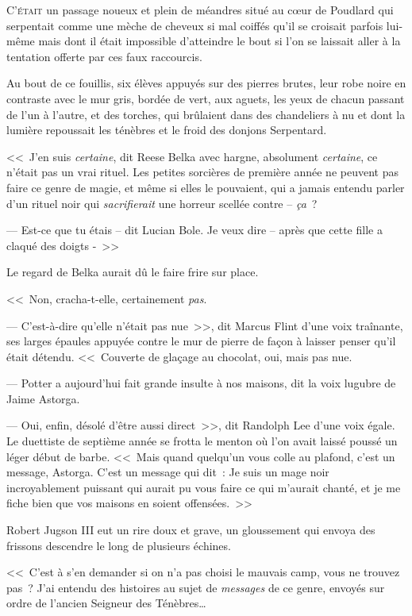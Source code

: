 
\lettrine{C}{'était} un passage noueux et plein de méandres situé au cœur de Poudlard qui serpentait comme une mèche de cheveux si mal coiffés qu'il se croisait parfois lui-même mais dont il était impossible d'atteindre le bout si l'on se laissait aller à la tentation offerte par ces faux raccourcis.

Au bout de ce fouillis, six élèves appuyés sur des pierres brutes, leur robe noire en contraste avec le mur gris, bordée de vert, aux aguets, les yeux de chacun passant de l'un à l'autre, et des torches, qui brûlaient dans des chandeliers à nu et dont la lumière repoussait les ténèbres et le froid des donjons Serpentard.

<<~J'en suis \emph{certaine}, dit Reese Belka avec hargne, absolument \emph{certaine}, ce n'était pas un vrai rituel. Les petites sorcières de première année ne peuvent pas faire ce genre de magie, et même si elles le pouvaient, qui a jamais entendu parler d'un rituel noir qui \emph{sacrifierait} une horreur scellée contre -- \emph{ça}~?

--- Est-ce que tu étais -- dit Lucian Bole. Je veux dire -- après que cette fille a claqué des doigts -~>>

Le regard de Belka aurait dû le faire frire sur place.

<<~Non, cracha-t-elle, certainement \emph{pas}.

--- C'est-à-dire qu'elle n'était pas nue~>>, dit Marcus Flint d'une voix traînante, ses larges épaules appuyée contre le mur de pierre de façon à laisser penser qu'il était détendu. <<~Couverte de glaçage au chocolat, oui, mais pas nue.

--- Potter a aujourd'hui fait grande insulte à nos maisons, dit la voix lugubre de Jaime Astorga.

--- Oui, enfin, désolé d'être aussi direct~>>, dit Randolph Lee d'une voix égale. Le duettiste de septième année se frotta le menton où l'on avait laissé poussé un léger début de barbe. <<~Mais quand quelqu'un vous colle au plafond, c'est un message, Astorga. C'est un message qui dit~: Je suis un mage noir incroyablement puissant qui aurait pu vous faire ce qui m'aurait chanté, et je me fiche bien que vos maisons en soient offensées.~>>

Robert Jugson III eut un rire doux et grave, un gloussement qui envoya des frissons descendre le long de plusieurs échines.

<<~C'est à s'en demander si on n'a pas choisi le mauvais camp, vous ne trouvez pas~? J'ai entendu des histoires au sujet de \emph{messages} de ce genre, envoyés sur ordre de l'ancien Seigneur des Ténèbres…

